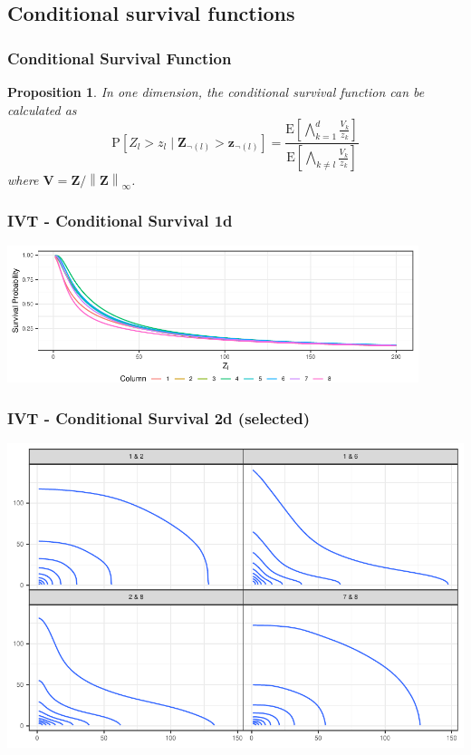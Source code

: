 \documentclass[aspectratio=169]{beamer}
\newcommand{\norm}[1]{\left\lVert #1 \right\rVert}
\newcommand{\pnorm}[2]{\norm{#1}_{#2}}
\newtheorem{prop}{Proposition}
\newlength{\frametextheight}
\begin{document}
\subsection{Conditional survival functions}

\begin{frame}
  \frametitle{Conditional Survival Function}
  \begin{prop}
      In one dimension, the conditional survival function can be calculated as
   \begin{equation*}
      \label{eqn:condsurv1df}
      \text{P}\left[Z_l > z_l\mid \bm{Z}_{\neg(l)} > \bm{z}_{\neg(l)}\right] =
        \frac{\text{E}\left[\bigwedge_{k = 1}^d \frac{V_k}{z_k}\right]}{
                      \text{E}\left[\bigwedge_{k \neq l}\frac{V_k}{z_k}\right]}
    \end{equation*}
      where $\bm{V} = \bm{Z} / \pnorm{\bm{Z}}{\infty}$.
  \end{prop}
\end{frame}


\begin{frame}
  \frametitle{IVT - Conditional Survival 1d}
  \begin{center}
    \includegraphics[height=0.8\frametextheight,width=0.9\textwidth]{./images/condsurv_1d}
  \end{center}
\end{frame}

\begin{frame}
  \frametitle{IVT - Conditional Survival 2d (selected)}
  \begin{center}
    \includegraphics[height=\frametextheight,width=\frametextheight]{./images/condsurv_2d}
  \end{center}
\end{frame}
\end{document}
